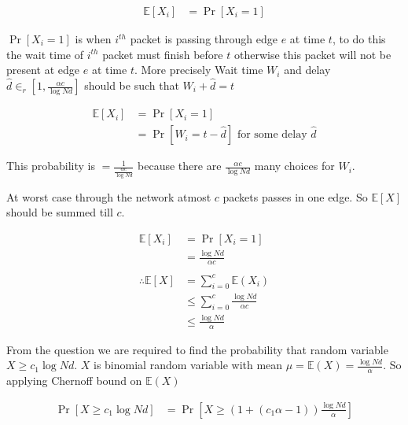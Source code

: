 \documentclass[addpoints,12pt]{exam}
\begin{document}
\begin{questions}
\begin{parts}
\begin{solution}
                    \begin{align*}
                        \mathbb{E}[X_i] &= \Pr[X_i = 1]
                    \end{align*}

                    $\Pr[X_i = 1]$ is when $i^{th}$ packet is passing through edge $e$ at time $t$, to do this the wait time of $i^{th}$ packet must finish before $t$ otherwise this packet will not be present at edge $e$ at time $t$. More precisely Wait time $W_i$ and delay $\hat{d} \in_r \left[1, \frac{\alpha c}{\log Nd}\right]$ should be such that $W_i + \hat{d} = t$

                    \begin{align*}
                        \mathbb{E}[X_i] &= \Pr[X_i = 1]\\
                        &= \Pr[W_i = t - \hat{d}] \text{ for some delay } \hat{d}
                    \end{align*}

                    This probability is $= \frac{1}{\frac{\alpha c}{\log Nd}}$ because there are $\frac{\alpha c}{\log Nd}$ many choices for $W_i$.

                    At worst case through the network atmost $c$ packets passes in one edge. So $\mathbb{E}[X]$ should be summed till $c$.
                    
                    \begin{align*}
                        \mathbb{E}[X_i] &= \Pr[X_i = 1]\\
                        &= \frac{\log Nd}{\alpha c}\\\\
                        \therefore \mathbb{E}[X] &= \displaystyle\sum_{i=0} ^{c} \mathbb{E}(X_i)\\
                        &\leq \displaystyle\sum_{i=0} ^{c} \frac{\log Nd}{\alpha c}\\
                        &\leq \frac{\log Nd}{\alpha}
                    \end{align*}

                    From the question we are required to find the probability that random variable $X \geq c_1\log Nd$. $X$ is binomial random variable with mean $\mu = \mathbb{E}(X) = \frac{\log Nd}{\alpha}$. So applying Chernoff bound on $\mathbb{E}(X)$

                    \begin{align*}
                        \Pr[X \geq c_1 \log Nd] &= \Pr\left[X \geq \left(1 + \left(c_1 \alpha - 1\right)\right) \frac{\log Nd}{\alpha}\right]\\
                    \end{align*}


\end{solution}
\end{parts}
\end{questions}
\end{document}
